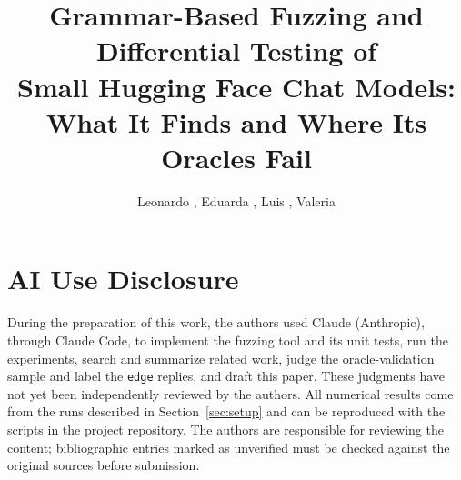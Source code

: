 \documentclass[12pt]{article}
\title{Grammar-Based Fuzzing and Differential Testing of\\Small Hugging Face Chat Models:\\What It Finds and Where Its Oracles Fail}
\author{Leonardo \todo{Surname}\inst{1}, Eduarda \todo{Surname}\inst{1}, Luis \todo{Surname}\inst{1}, Valeria \todo{Surname}\inst{1}}
\newcommand{\code}[1]{\texttt{#1}}
\begin{document}
\maketitle

\begin{abstract}

\end{abstract}











\section*{AI Use Disclosure}
During the preparation of this work, the authors used Claude (Anthropic), through Claude Code, to implement the fuzzing tool and its unit tests, run the experiments, search and summarize related work, judge the oracle-validation sample and label the \code{edge} replies, and draft this paper. These judgments have not yet been independently reviewed by the authors. All numerical results come from the runs described in Section~\ref{sec:setup} and can be reproduced with the scripts in the project repository. The authors are responsible for reviewing the content; bibliographic entries marked as unverified must be checked against the original sources before submission.



\end{document}
